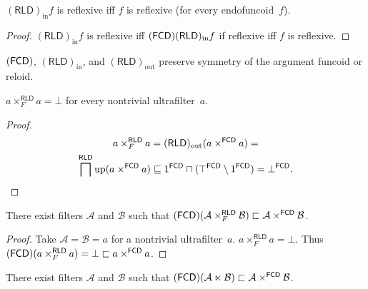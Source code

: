 \begin{prop}
  $(\mathsf{RLD})_{\operatorname{in}} f$ is reflexive iff $f$ is reflexive (for
  every endofuncoid~$f$).
\end{prop}

\begin{proof}
  $(\mathsf{RLD})_{\operatorname{in}} f$ is reflexive iff
  $(\mathsf{FCD}) (\mathsf{RLD})_{\operatorname{in}} f$ if reflexive iff
  $f$ is reflexive.
\end{proof}

\begin{obvious}
$(\mathsf{FCD})$, $(\mathsf{RLD})_{\operatorname{in}}$, and
$(\mathsf{RLD})_{\operatorname{out}}$ preserve symmetry of the argument funcoid
or reloid.\end{obvious}

\begin{prop}
  $a \times^{\mathsf{RLD}}_F a = \bot$ for every nontrivial ultrafilter~$a$.
\end{prop}

\begin{proof}
\begin{multline*}
  a \times^{\mathsf{RLD}}_F a = (\mathsf{RLD})_{\operatorname{out}} (a
  \times^{\mathsf{FCD}} a) = \\ \bigsqcap^{\mathsf{RLD}} \operatorname{up}
  (a \times^{\mathsf{FCD}} a) \sqsubseteq 1^{\mathsf{FCD}}
  \sqcap (\top^{\mathsf{FCD}} \setminus 1^{\mathsf{FCD}}) =
  \bot^{\mathsf{FCD}}.
\end{multline*}
\end{proof}

\begin{example}
  There exist filters $\mathcal{A}$ and $\mathcal{B}$ such that
  $(\mathsf{FCD}) (\mathcal{A} \times^{\mathsf{RLD}}_F
  \mathcal{B}) \sqsubset \mathcal{A} \times^{\mathsf{FCD}}
  \mathcal{B}$.
\end{example}

\begin{proof}
  Take $\mathcal{A} = \mathcal{B} = a$ for a nontrivial ultrafilter~$a$. $a
  \times^{\mathsf{RLD}}_F a = \bot$. Thus $(\mathsf{FCD}) (a
  \times^{\mathsf{RLD}}_F a) = \bot \sqsubset a
  \times^{\mathsf{FCD}} a$.
\end{proof}

\begin{conjecture}
  There exist filters $\mathcal{A}$ and $\mathcal{B}$ such that
  $(\mathsf{FCD}) (\mathcal{A} \ltimes \mathcal{B}) \sqsubset
  \mathcal{A} \times^{\mathsf{FCD}} \mathcal{B}$.
\end{conjecture}


